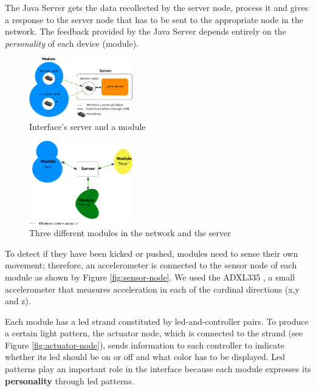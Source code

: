The Java Server gets the data recollected by the server node, process it and gives a response to the server node that has to be sent to the appropriate node in the network. The feedback provided by the Java Server depends entirely on the \emph{personality} of each device (module).

\begin{figure}[h!]
 \centering
 \includegraphics[width= 0.4\textwidth, clip=true  ,keepaspectratio=true]{./graph/entity_server.png}
 \caption{Interface's server and a module}
 \label{fig:server-module}
\end{figure}

\begin{figure}[h!]
 \centering
 \includegraphics[width= 0.4\textwidth, clip=true  ,keepaspectratio=true]{./graph/network.png}
 \caption{Three different modules in the network and the server}
 \label{fig:modules}
\end{figure}



To detect if they have been kicked or pushed, modules need to sense their own movement; therefore, an accelerometer is connected to the sensor node of each module as shown by Figure \ref{fig:sensor-node}. We used the ADXL335 \cite{ADXL335}, a small accelerometer that measures acceleration in each of the cardinal directions (x,y and z).

Each module has a led strand constituted by led-and-controller pairs. To produce a certain light pattern, the actuator node, which is connected to the strand (see Figure \ref{fig:actuator-node}), sends information to each controller to indicate whether its led should be on or off and what color has to be displayed. Led patterns play an important role in the interface because each module expresses its \textbf{personality} through led patterns.  

